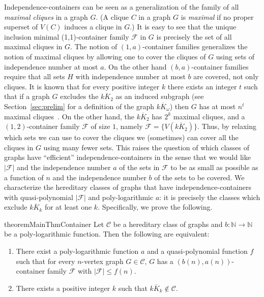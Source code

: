 \documentclass[11pt]{amsart}
\newcommand{\cal}{\mathcal}
\begin{document}
Independence-containers can be seen as a generalization of the family of all {\em maximal cliques} in a graph $G$. (A clique $C$ in a graph $G$ is {\em maximal} if no proper superset of $V(C)$ induces a clique in $G$.) It is easy to see that the unique inclusion minimal (1,1)-container family ${\cal F}$ in $G$ is precisely the set of all maximal cliques in $G$. The notion of $(1,a)$-container families generalizes the notion of maximal cliques by allowing one to cover the cliques of $G$ using sets of independence number at most $a$. On the other hand $(b,a)$-container families require that all sets $H$ with independence number at most $b$ are covered, not only cliques. 
%
It is known that for every positive integer $k$ there exists an integer $t$ such that if a graph $G$ excludes the $\overline{kK_2}$ as an induced subgraph (see Section~\ref{sec:prelim} for a definition of the graph $\overline{kK_\omega}$) then $G$ has at most $n^{t}$ maximal cliques~\cite{BalasY89}. On the other hand, the $\overline{kK_2}$ has $2^k$ maximal cliques, and a $(1,2)$-container family ${\cal F}$ of size $1$, namely ${\cal F} = \{V(\overline{kK_2})\}$. 
%
Thus, by relaxing which sets we can use to cover the cliques we (sometimes) can cover all the cliques in $G$ using many fewer sets. This raises the question of which classes of graphs have ``efficient'' independence-containers in the sense that we would like $|{\cal F}|$ and the independence number $a$ of the sets in ${\cal F}$ to be as small as possible as a function of $n$ and the independence number $b$ of the sets to be covered. We characterize the hereditary classes of graphs that have independence-containers with quasi-polynomial $|{\cal F}|$ and poly-logarithmic $a$: it is precisely the classes which exclude $\overline{kK_k}$ for at least one $k$. Specifically, we prove the following.


\begin{restatable}{theorem}{MainThmContainer}\label{thm:containerIff}
    Let ${\cal C}$ be a hereditary class of graphs and $b : \mathbb{N} \rightarrow \mathbb{N}$ be a 
    poly-logarithmic function.
    Then the following are equivalent:
    \begin{enumerate}\setlength\itemsep{-.7pt}
        \item[(i)] There exist  a poly-logarithmic function $a$ and a quasi-polynomial function $f$  such that for every $n$-vertex graph $G \in {\cal C}$, $G$ has a $(b(n), a(n))$-container family ${\cal F}$ with $|\mathcal{F}| \leq f(n)$. 
        \item[(ii)] There exists a positive integer $k$ such that  $\overline{kK_k} \notin {\cal C}$.
    \end{enumerate}
\end{restatable}
\end{document}
